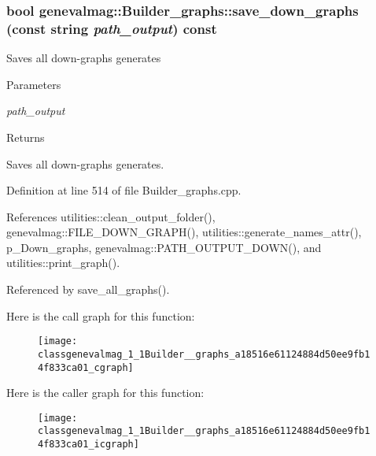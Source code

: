 \hypertarget{classgenevalmag_1_1Builder__graphs_a18516e61124884d50ee9fb14f833ca01}{
\subsubsection[{save\_\-down\_\-graphs}]{\setlength{\rightskip}{0pt plus 5cm}bool genevalmag::Builder\_\-graphs::save\_\-down\_\-graphs (const string {\em path\_\-output}) const}}
\label{classgenevalmag_1_1Builder__graphs_a18516e61124884d50ee9fb14f833ca01}
Saves all down-\/graphs generates 
\begin{DoxyParams}{Parameters}
\item[{\em path\_\-output}]\end{DoxyParams}
\begin{DoxyReturn}{Returns}

\end{DoxyReturn}
Saves all down-\/graphs generates. 

Definition at line 514 of file Builder\_\-graphs.cpp.



References utilities::clean\_\-output\_\-folder(), genevalmag::FILE\_\-DOWN\_\-GRAPH(), utilities::generate\_\-names\_\-attr(), p\_\-Down\_\-graphs, genevalmag::PATH\_\-OUTPUT\_\-DOWN(), and utilities::print\_\-graph().



Referenced by save\_\-all\_\-graphs().



Here is the call graph for this function:\nopagebreak
\begin{figure}[H]
\begin{center}
\leavevmode
\texttt{[image: classgenevalmag\_1\_1Builder\_\_graphs\_a18516e61124884d50ee9fb14f833ca01\_cgraph]}
\end{center}
\end{figure}




Here is the caller graph for this function:\nopagebreak
\begin{figure}[H]
\begin{center}
\leavevmode
\texttt{[image: classgenevalmag\_1\_1Builder\_\_graphs\_a18516e61124884d50ee9fb14f833ca01\_icgraph]}
\end{center}
\end{figure}


